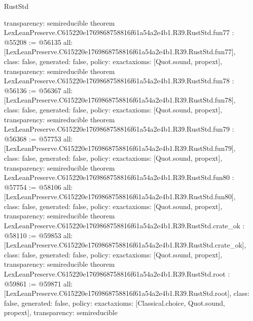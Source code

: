 \begin{lexlean}{RustStd}
\begin{coremodule}
{  transparency: semireducible
}
theorem LexLeanPreserve.C615220e1769868758816f61a54a2e4b1.R39.RustStd.fun77 : @55208 := @56135 {
  all: [LexLeanPreserve.C615220e1769868758816f61a54a2e4b1.R39.RustStd.fun77],
  class: false,
  generated: false,
  policy: exact{axioms: [Quot.sound, propext]},
  transparency: semireducible
}
theorem LexLeanPreserve.C615220e1769868758816f61a54a2e4b1.R39.RustStd.fun78 : @56136 := @56367 {
  all: [LexLeanPreserve.C615220e1769868758816f61a54a2e4b1.R39.RustStd.fun78],
  class: false,
  generated: false,
  policy: exact{axioms: [Quot.sound, propext]},
  transparency: semireducible
}
theorem LexLeanPreserve.C615220e1769868758816f61a54a2e4b1.R39.RustStd.fun79 : @56368 := @57753 {
  all: [LexLeanPreserve.C615220e1769868758816f61a54a2e4b1.R39.RustStd.fun79],
  class: false,
  generated: false,
  policy: exact{axioms: [Quot.sound, propext]},
  transparency: semireducible
}
theorem LexLeanPreserve.C615220e1769868758816f61a54a2e4b1.R39.RustStd.fun80 : @57754 := @58106 {
  all: [LexLeanPreserve.C615220e1769868758816f61a54a2e4b1.R39.RustStd.fun80],
  class: false,
  generated: false,
  policy: exact{axioms: [Quot.sound, propext]},
  transparency: semireducible
}
theorem LexLeanPreserve.C615220e1769868758816f61a54a2e4b1.R39.RustStd.crate_ok : @58110 := @59853 {
  all: [LexLeanPreserve.C615220e1769868758816f61a54a2e4b1.R39.RustStd.crate_ok],
  class: false,
  generated: false,
  policy: exact{axioms: [Quot.sound, propext]},
  transparency: semireducible
}
theorem LexLeanPreserve.C615220e1769868758816f61a54a2e4b1.R39.RustStd.root : @59861 := @59871 {
  all: [LexLeanPreserve.C615220e1769868758816f61a54a2e4b1.R39.RustStd.root],
  class: false,
  generated: false,
  policy: exact{axioms: [Classical.choice, Quot.sound, propext]},
  transparency: semireducible
}


\end{coremodule}
\end{lexlean}
